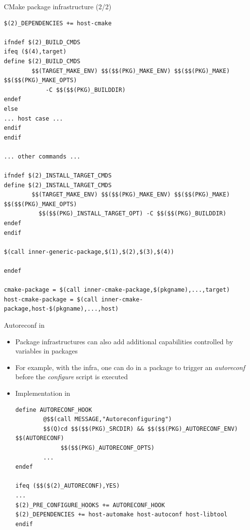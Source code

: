 \begin{frame}[fragile]{CMake package infrastructure (2/2)}

\begin{block}{}
\begin{verbatim}
$(2)_DEPENDENCIES += host-cmake

ifndef $(2)_BUILD_CMDS
ifeq ($(4),target)
define $(2)_BUILD_CMDS
        $$(TARGET_MAKE_ENV) $$($$(PKG)_MAKE_ENV) $$($$(PKG)_MAKE) $$($$(PKG)_MAKE_OPTS)
            -C $$($$(PKG)_BUILDDIR)
endef
else
... host case ...
endif
endif

... other commands ...

ifndef $(2)_INSTALL_TARGET_CMDS
define $(2)_INSTALL_TARGET_CMDS
        $$(TARGET_MAKE_ENV) $$($$(PKG)_MAKE_ENV) $$($$(PKG)_MAKE) $$($$(PKG)_MAKE_OPTS)
          $$($$(PKG)_INSTALL_TARGET_OPT) -C $$($$(PKG)_BUILDDIR)
endef
endif

$(call inner-generic-package,$(1),$(2),$(3),$(4))

endef

cmake-package = $(call inner-cmake-package,$(pkgname),...,target)
host-cmake-package = $(call inner-cmake-package,host-$(pkgname),...,host)
\end{verbatim}
\end{block}

\end{frame}

\begin{frame}[fragile]{Autoreconf in }
  \begin{itemize}
  \item Package infrastructures can also add additional capabilities
    controlled by variables in packages
  \item For example, with the  infra, one can
    do  in a package to trigger an {\em
      autoreconf} before the {\em configure} script is executed
  \item Implementation in 
    \begin{block}{}
      \begin{verbatim}
define AUTORECONF_HOOK
        @$$(call MESSAGE,"Autoreconfiguring")
        $$(Q)cd $$($$(PKG)_SRCDIR) && $$($$(PKG)_AUTORECONF_ENV) $$(AUTORECONF)
             $$($$(PKG)_AUTORECONF_OPTS)
        ...
endef

ifeq ($$($(2)_AUTORECONF),YES)
...
$(2)_PRE_CONFIGURE_HOOKS += AUTORECONF_HOOK
$(2)_DEPENDENCIES += host-automake host-autoconf host-libtool
endif
      \end{verbatim}
    \end{block}
  \end{itemize}
\end{frame}

